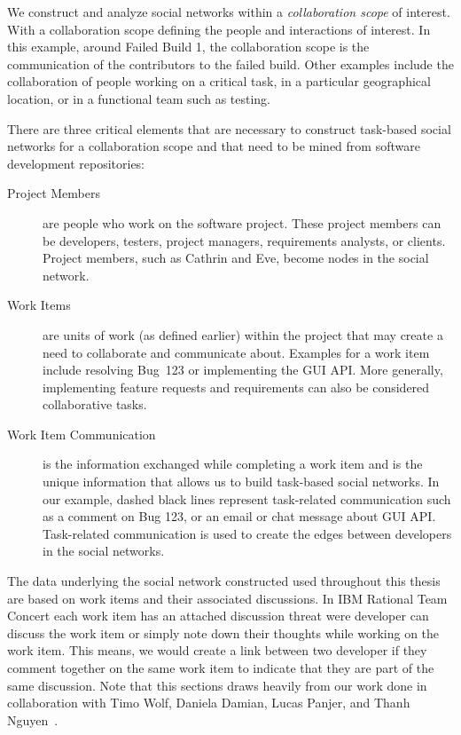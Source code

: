 We construct and analyze social networks within a \emph{collaboration scope} of interest.
With a collaboration scope defining the people and interactions of interest.
In this example, around Failed Build 1, the collaboration scope is the communication of the contributors to the failed build. 
Other examples include the collaboration of people working on a critical task, in a particular geographical location, or in a functional team such as testing.

There are three critical elements that are necessary to construct task-based social networks for a collaboration scope and that need to be mined from software development repositories:

\begin{description}
\item[Project Members] are people who work on the software project. 
These project members can be developers, testers, project managers, requirements analysts,
or clients. 
Project members, such as Cathrin and Eve, become nodes in the social network.

\item[Work Items] are units of work (as defined earlier) within the project that may create a need to collaborate and communicate about. 
Examples for a work item include resolving Bug~123 or implementing the GUI API. 
More generally, implementing feature requests and requirements can also be considered collaborative tasks.

\item[Work Item Communication] is the information exchanged while completing a work item and is the unique information that allows us to build task-based social networks. 
In our example, dashed black lines represent task-related communication such as a comment on Bug 123, or an email or chat message about GUI API.
Task-related communication is used to create the edges between developers in the social networks.
\end{description}

The data underlying the social network constructed used throughout this thesis are based on work items and their associated discussions.
In IBM Rational Team Concert each work item has an attached discussion threat were developer can discuss the work item or simply note down their thoughts while working on the work item.
This means, we would create a link between two developer if they comment together on the same work item to indicate that they are part of the same discussion.
Note that this sections draws heavily from our work done in collaboration with Timo Wolf, Daniela Damian, Lucas Panjer, and Thanh Nguyen~\cite{wolf:ieee:2009}.

